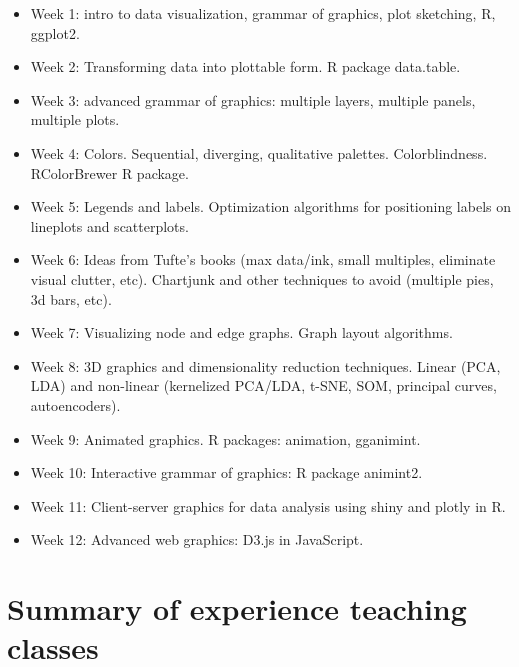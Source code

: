 \documentclass{article}
\begin{document}
\begin{itemize}
\item Week 1: intro to data visualization, grammar of graphics, plot
  sketching, R, ggplot2.
\item Week 2: Transforming data into plottable form. R package
  data.table.
\item Week 3: advanced grammar of graphics: multiple layers, multiple
  panels, multiple plots.
\item Week 4: Colors. Sequential, diverging, qualitative palettes.
  Colorblindness. RColorBrewer R package.
\item Week 5: Legends and labels. Optimization algorithms for positioning
  labels on lineplots and scatterplots.
\item Week 6: Ideas from Tufte's books (max data/ink, small multiples,
  eliminate visual clutter, etc). Chartjunk and other techniques to
  avoid (multiple pies, 3d bars, etc).
\item Week 7: Visualizing node and edge graphs. Graph layout algorithms.
\item Week 8: 3D graphics and dimensionality reduction techniques. Linear
  (PCA, LDA) and non-linear (kernelized PCA/LDA, t-SNE, SOM, principal
  curves, autoencoders).
\item Week 9: Animated graphics. R packages: animation, gganimint.
\item Week 10: Interactive grammar of graphics: R package animint2.
\item Week 11: Client-server graphics for data analysis using shiny
  and plotly in R.
\item Week 12: Advanced web graphics: D3.js in JavaScript.
\end{itemize}

\section{Summary of experience teaching classes} 

\end{document}
